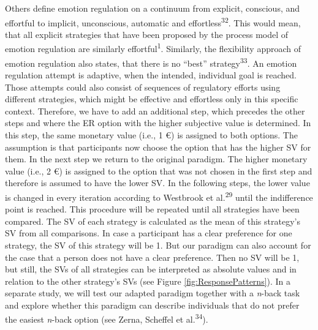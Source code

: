 \documentclass[
  man,floatsintext]{apa6}
\begin{document}
Others define emotion regulation on a continuum from explicit, conscious, and effortful to implicit, unconscious, automatic and effortless\textsuperscript{32}.
This would mean, that all explicit strategies that have been proposed by the process model of emotion regulation are similarly effortful\textsuperscript{1}.
Similarly, the flexibility approach of emotion regulation also states, that there is no ``best'' strategy\textsuperscript{33}.
An emotion regulation attempt is adaptive, when the intended, individual goal is reached. Those attempts could also consist of sequences of regulatory efforts using different strategies, which might be effective and effortless only in this specific context.
Therefore, we have to add an additional step, which precedes the other steps and where the ER option with the higher subjective value is determined.
In this step, the same monetary value (i.e., 1 €) is assigned to both options.
The assumption is that participants now choose the option that has the higher SV for them.
In the next step we return to the original paradigm.
The higher monetary value (i.e., 2 €) is assigned to the option that was not chosen in the first step and therefore is assumed to have the lower SV.
In the following steps, the lower value is changed in every iteration according to Westbrook et al.\textsuperscript{29} until the indifference point is reached.
This procedure will be repeated until all strategies have been compared.
The SV of each strategy is calculated as the mean of this strategy's SV from all comparisons.
In case a participant has a clear preference for one strategy, the SV of this strategy will be 1.
But our paradigm can also account for the case that a person does not have a clear preference.
Then no SV will be 1, but still, the SVs of all strategies can be interpreted as absolute values and in relation to the other strategy's SVs (see Figure \ref{fig:ResponsePatterns}).
In a separate study, we will test our adapted paradigm together with a \emph{n}-back task and explore whether this paradigm can describe individuals that do not prefer the easiest \emph{n}-back option (see Zerna, Scheffel et al.\textsuperscript{34}).
\end{document}
